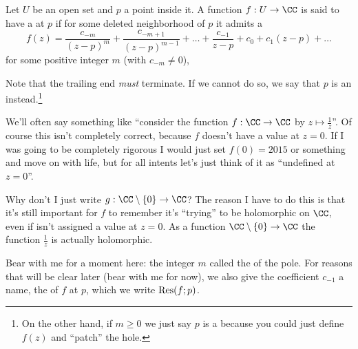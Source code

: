 \begin{definition}
	Let $U$ be an open set and $p$ a point inside it.
	A function $f : U \to \CC$ is said to have a  at $p$
	if for some deleted neighborhood of $p$ it admits a 
	\[
		f(z) =
		\frac{c_{-m}}{(z-p)^m}
		+ \frac{c_{-m+1}}{(z-p)^{m-1}}
		+ \dots
		+ \frac{c_{-1}}{z-p} + c_0 + c_1 (z-p) + \dots
	\]
	for some positive integer $m$ (with $c_{-m} \neq 0$),
\end{definition}

Note that the trailing end \emph{must} terminate.
If we cannot do so, we say that $p$ is an  instead.\footnote{%
	On the other hand, if $m \ge 0$ we just say $p$ is a 
	because you could just define $f(z)$ and ``patch'' the hole.}

\begin{abuse}
	We'll often say something like ``consider the function $f : \CC \to \CC$ by $z \mapsto \frac 1z$''.
	Of course this isn't completely correct, because $f$ doesn't have a value at $z=0$.
	If I was going to be completely rigorous I would just set $f(0) = 2015$ or something and move on
	with life, but for all intents let's just think of it as ``undefined at $z=0$''.

	Why don't I just write $g : \CC \setminus \{0\} \to \CC$?
	The reason I have to do this is that it's still important 
	for $f$ to remember it's ``trying'' to be holomorphic on $\CC$,
	even if isn't assigned a value at $z=0$.
	As a function $\CC \setminus \{0\} \to \CC$ the function $\frac 1z$ is actually holomorphic.
\end{abuse}

\begin{definition}
	Bear with me for a moment here: the integer $m$ called the  of the pole.
	For reasons that will be clear later (bear with me for now), we also
	give the coefficient $c_{-1}$ a name, the  of $f$ at $p$,
	which we write $\operatorname{Res}(f;p)$.
\end{definition}

